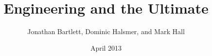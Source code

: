 \documentclass{book}
\begin{document}
\title{Engineering and the Ultimate}
\author{Jonathan Bartlett, Dominic Halsmer, and Mark Hall}
\date{April 2013}
\maketitle

\tableofcontents























\cleardoublepage
{}
\printindex
\end{document}
